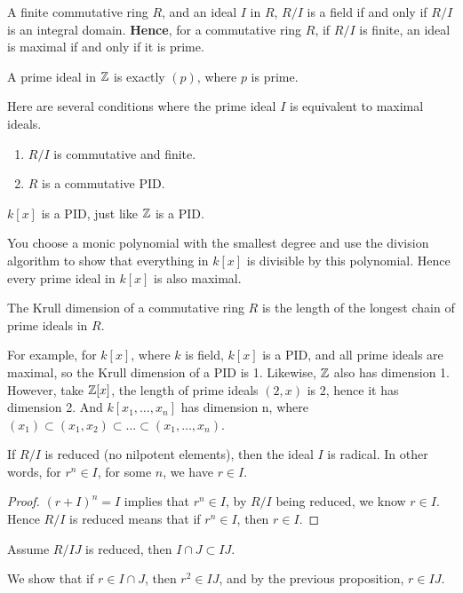 \begin{example}
    A finite commutative ring $R$, and an ideal $I$ in $R$, $R/I$ is a field if and only if $R/I$ is an integral domain. \textbf{Hence}, for a commutative ring $R$, if $R/I$ is finite, an ideal is maximal if and only if it is prime.
\end{example}
\begin{example}
    A prime ideal in $\mathbb{Z}$ is exactly $(p)$, where $p$ is prime.
\end{example}
\begin{prop}
    Here are several conditions where the prime ideal $I$ is equivalent to maximal ideals.
    \begin{enumerate}
        \item $R/I$ is commutative and finite.
        \item $R$ is a commutative PID.
    \end{enumerate}
\end{prop}

\begin{example}
    $k[x]$ is a PID, just like $\mathbb{Z}$ is a PID.

    You choose a monic polynomial with the smallest degree and use the division algorithm to show that everything in $k[x]$ is divisible by this polynomial. Hence every prime ideal in $k[x]$ is also maximal.
\end{example}

\begin{defn}
    The Krull dimension of a commutative ring $R$ is the length of the longest chain of prime ideals in $R$.
\end{defn}
For example, for $k[x]$, where $k$ is field, $k[x]$ is a PID, and all prime ideals are maximal, so the Krull dimension of a PID is 1. Likewise, $\mathbb{Z}$ also has dimension 1. However, take $\mathbb{Z}[x]$, the length of prime ideals $(2,x)$ is 2, hence it has dimension 2. And $k[x_1, \ldots, x_n]$ has dimension n, where $(x_1)\subset (x_1, x_2)\subset\ldots\subset (x_1, \ldots, x_n)$.

\begin{prop}
    If $R/I$ is reduced (no nilpotent elements), then the ideal $I$ is radical. In other words, for $r^n\in I$, for some $n$, we have $r\in I$.
\end{prop}
\begin{proof}
    $(r+I)^n=I$ implies that $r^n\in I$, by $R/I$ being reduced, we know $r\in I$. Hence $R/I$ is reduced means that if $r^n\in I$, then $r\in I$. 
\end{proof}

\begin{example}
    Assume $R/IJ$ is reduced, then $I\cap J\subset IJ$. 

    We show that if $r\in I\cap J$, then $r^2\in IJ$, and by the previous proposition, $r\in IJ$.
\end{example}
